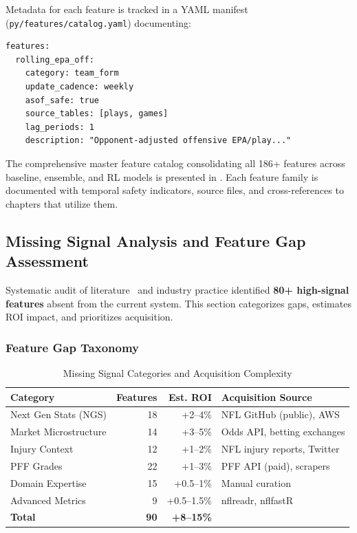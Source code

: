 Metadata for each feature is tracked in a YAML manifest (\texttt{py/features/catalog.yaml}) documenting:
\begin{lstlisting}[basicstyle=\ttfamily\scriptsize]
features:
  rolling_epa_off:
    category: team_form
    update_cadence: weekly
    asof_safe: true
    source_tables: [plays, games]
    lag_periods: 1
    description: "Opponent-adjusted offensive EPA/play..."
\end{lstlisting}

The comprehensive master feature catalog consolidating all 186+ features across baseline, ensemble, and RL models is presented in . Each feature family is documented with temporal safety indicators, source files, and cross-references to chapters that utilize them.



\subsection{Missing Signal Analysis and Feature Gap Assessment}
\label{subsec:missing_signals}

Systematic audit of literature~\cite{lopez2020big, yurko2020going, deshpande2016estimating} and industry practice identified \textbf{80+ high-signal features} absent from the current system. This section categorizes gaps, estimates ROI impact, and prioritizes acquisition.

\subsubsection{Feature Gap Taxonomy}

\begin{table}[htbp]
\centering
\small
\caption{Missing Signal Categories and Acquisition Complexity}
\label{tab:missing_signals_taxonomy}
\begin{tabular}{@{}lrrp{4.5cm}@{}}
\toprule
\textbf{Category} & \textbf{Features} & \textbf{Est. ROI} & \textbf{Acquisition Source} \\
\midrule
Next Gen Stats (NGS) & 18 & +2--4\% & NFL GitHub (public), AWS \\
Market Microstructure & 14 & +3--5\% & Odds API, betting exchanges \\
Injury Context & 12 & +1--2\% & NFL injury reports, Twitter \\
PFF Grades & 22 & +1--3\% & PFF API (paid), scrapers \\
Domain Expertise & 15 & +0.5--1\% & Manual curation \\
Advanced Metrics & 9 & +0.5--1.5\% & nflreadr, nflfastR \\
\midrule
\textbf{Total} & \textbf{90} & \textbf{+8--15\%} & \\
\bottomrule
\end{tabular}
\end{table}

